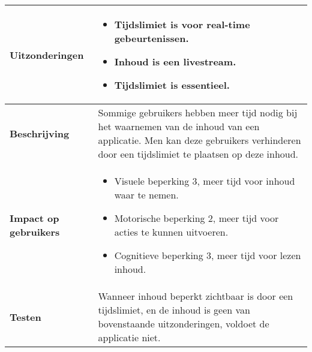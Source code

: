 \begin{table}[H]
\begin{tabular}{|l|p{12cm}|}
        \hline
        \textbf{Uitzonderingen}     & 
        \begin{itemize}
            \item Tijdslimiet is voor real-time gebeurtenissen.
            \item Inhoud is een livestream.
            \item Tijdslimiet is essentieel.
        \end{itemize}                                                                                                                                                                                                   \\ 
        \hline
        \textbf{Beschrijving}                 & Sommige gebruikers hebben meer tijd nodig bij het waarnemen van de inhoud van een applicatie. Men kan deze gebruikers verhinderen door een tijdslimiet te plaatsen op deze inhoud. \\ 
        \hline
        \textbf{Impact op gebruikers}         &  
        \begin{itemize}
            \item Visuele beperking 3, meer tijd voor inhoud waar te nemen.
               \item Motorische beperking 2, meer tijd voor acties te kunnen uitvoeren.
            \item Cognitieve beperking 3, meer tijd voor lezen inhoud.
        \end{itemize}                                                                                                                                                                                                                                                                                                                                                                                                                    \\ 
        \hline
        \textbf{Testen}                       & Wanneer inhoud beperkt zichtbaar is door een tijdslimiet, en de inhoud is geen van bovenstaande uitzonderingen, voldoet de applicatie niet.                                                                                                                                                                                                                  \\
        \hline
    \end{tabular}
    
\end{table}
\newpage
